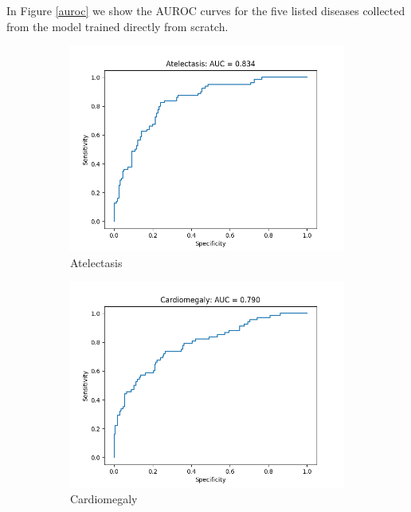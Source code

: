 \documentclass{amia}
\begin{document}
In Figure \ref{auroc} we show the AUROC curves for the five listed diseases collected from the model trained directly from scratch.

\begin{figure}[th]
\begin{subfigure}{0.19\linewidth}
	\centering
	\includegraphics[width=\linewidth]{Atelectasis_roc.png}
	\caption{Atelectasis}\label{ROC_Atelectasis}
\end{subfigure}
\begin{subfigure}{0.19\linewidth}
	\centering
	\includegraphics[width=\linewidth]{Cardiomegaly_roc.png}
	\caption{Cardiomegaly}\label{ROC_Cardiomegaly}
\end{subfigure}
\begin{subfigure}{0.19\linewidth}

\end{subfigure}
\end{figure}
\end{document}
